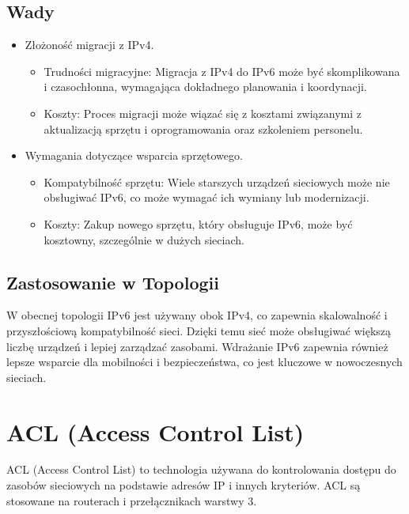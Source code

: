 \subsection{Wady}
\begin{itemize}
    \item Złożoność migracji z IPv4.
    \begin{itemize}
        \item Trudności migracyjne: Migracja z IPv4 do IPv6 może być skomplikowana i czasochłonna, wymagająca dokładnego planowania i koordynacji.
        \item Koszty: Proces migracji może wiązać się z kosztami związanymi z aktualizacją sprzętu i oprogramowania oraz szkoleniem personelu.
    \end{itemize}
    \item Wymagania dotyczące wsparcia sprzętowego.
    \begin{itemize}
        \item Kompatybilność sprzętu: Wiele starszych urządzeń sieciowych może nie obsługiwać IPv6, co może wymagać ich wymiany lub modernizacji.
        \item Koszty: Zakup nowego sprzętu, który obsługuje IPv6, może być kosztowny, szczególnie w dużych sieciach.
    \end{itemize}
\end{itemize}

\subsection{Zastosowanie w Topologii}
W obecnej topologii IPv6 jest używany obok IPv4, co zapewnia skalowalność i przyszłościową kompatybilność sieci. Dzięki temu sieć może obsługiwać większą liczbę urządzeń i lepiej zarządzać zasobami. Wdrażanie IPv6 zapewnia również lepsze wsparcie dla mobilności i bezpieczeństwa, co jest kluczowe w nowoczesnych sieciach.

\section{ACL (Access Control List)}

ACL (Access Control List) to technologia używana do kontrolowania dostępu do zasobów sieciowych na podstawie adresów IP i innych kryteriów. ACL są stosowane na routerach i przełącznikach warstwy 3.

